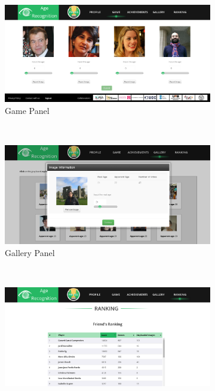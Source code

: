 \begin{figure}[!h]
	\centering
	\begin{subfigure}[b]{0.3\textwidth}
		\includegraphics[width=\textwidth]{figures/age_app_1}
		\caption{Game Panel}
		\label{fig:game}
	\end{subfigure}%
	~ %
	\begin{subfigure}[b]{0.3\textwidth}
		\includegraphics[width=\textwidth]{figures/age_app_2}
		\caption{Gallery Panel}
		\label{fig:gallery}
	\end{subfigure}
	~ %
	\begin{subfigure}[b]{0.3\textwidth}
		\includegraphics[width=\textwidth]{figures/age_app_3}

\end{subfigure}
\end{figure}
